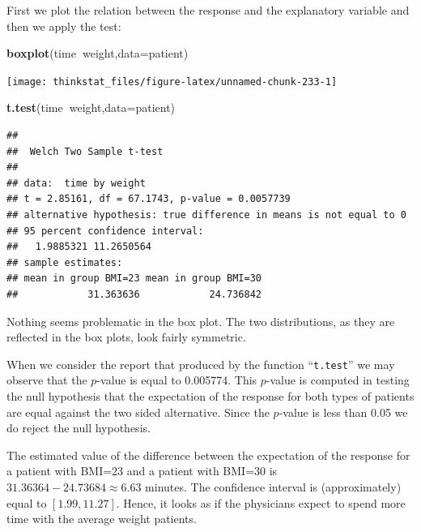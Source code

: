 \documentclass[]{krantz}
\makeatletter
\newenvironment{Shaded}{\begin{snugshade}}{\end{snugshade}}
\newcommand{\KeywordTok}[1]{\textcolor[rgb]{0.13,0.29,0.53}{\textbf{#1}}}
\newcommand{\DataTypeTok}[1]{\textcolor[rgb]{0.13,0.29,0.53}{#1}}
\newcommand{\OperatorTok}[1]{\textcolor[rgb]{0.81,0.36,0.00}{\textbf{#1}}}
\newcommand{\NormalTok}[1]{#1}
\newenvironment{kframe}{%
\medskip{}
\setlength{\fboxsep}{.8em}
 \def\at@end@of@kframe{}%
 \ifinner\ifhmode%
  \def\at@end@of@kframe{\end{minipage}}%
  \begin{minipage}{\columnwidth}%
 \fi\fi%
 \def\FrameCommand##1{\hskip\@totalleftmargin \hskip-\fboxsep
 \colorbox{shadecolor}{##1}\hskip-\fboxsep
     \hskip-\linewidth \hskip-\@totalleftmargin \hskip\columnwidth}%
 \MakeFramed {\advance\hsize-\width
   \@totalleftmargin\z@ \linewidth\hsize
   \@setminipage}}%
 {\par\unskip\endMakeFramed%
 \at@end@of@kframe}
\renewenvironment{Shaded}{\begin{kframe}}{\end{kframe}}
\theoremstyle{definition}
\theoremstyle{definition}
\theoremstyle{definition}
\theoremstyle{remark}
\makeatother
\begin{document}
First we plot the relation between the response and the explanatory
variable and then we apply the test:

\begin{Shaded}
\begin{Highlighting}[]
\KeywordTok{boxplot}\NormalTok{(time}\OperatorTok{~}\NormalTok{weight,}\DataTypeTok{data=}\NormalTok{patient)}
\end{Highlighting}
\end{Shaded}

\begin{center}\texttt{[image: thinkstat\_files/figure-latex/unnamed-chunk-233-1]} \end{center}

\begin{Shaded}
\begin{Highlighting}[]
\KeywordTok{t.test}\NormalTok{(time}\OperatorTok{~}\NormalTok{weight,}\DataTypeTok{data=}\NormalTok{patient)}
\end{Highlighting}
\end{Shaded}

\begin{verbatim}
## 
##  Welch Two Sample t-test
## 
## data:  time by weight
## t = 2.85161, df = 67.1743, p-value = 0.0057739
## alternative hypothesis: true difference in means is not equal to 0
## 95 percent confidence interval:
##   1.9885321 11.2650564
## sample estimates:
## mean in group BMI=23 mean in group BMI=30 
##            31.363636            24.736842
\end{verbatim}

Nothing seems problematic in the box plot. The two distributions, as
they are reflected in the box plots, look fairly symmetric.

When we consider the report that produced by the function
``\texttt{t.test}'' we may observe that the \(p\)-value is equal to
0.005774. This \(p\)-value is computed in testing the null hypothesis
that the expectation of the response for both types of patients are
equal against the two sided alternative. Since the \(p\)-value is less
than 0.05 we do reject the null hypothesis.

The estimated value of the difference between the expectation of the
response for a patient with BMI=23 and a patient with BMI=30 is
\(31.36364 -24.73684 \approx 6.63\) minutes. The confidence interval is
(approximately) equal to \([1.99, 11.27]\). Hence, it looks as if the
physicians expect to spend more time with the average weight patients.
\end{document}
